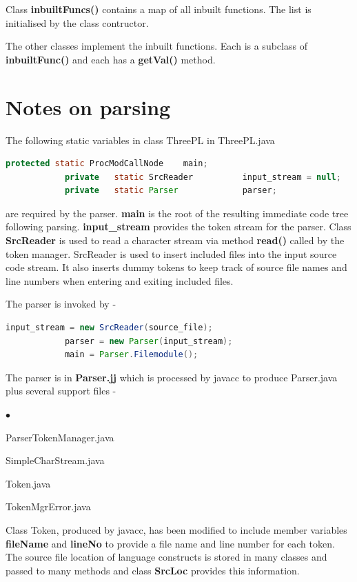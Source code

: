 \documentclass[10pt,a4paper,twoside,fleqn]{book}
\newcommand{\blist}{\begin{list}{$\bullet$}{\setlength{\itemsep}{-5pt}\setlength{\topsep}{-5pt}}}
\newcommand{\blend}{\end{list}}
\begin{document}
            Class {\bf inbuiltFuncs()} contains a map of all inbuilt functions. The
            list is initialised by the class contructor.

            The other classes implement the inbuilt functions. Each is a subclass
            of {\bf inbuiltFunc()} and each has a {\bf getVal()} method.




    \section{Notes on parsing}
    
        The following static variables in class ThreePL in ThreePL.java
        \begin{lstlisting}[gobble=8, language=java]
            protected static ProcModCallNode    main;
            private   static SrcReader          input_stream = null;
            private   static Parser             parser;
        \end{lstlisting}
        are required by the parser. {\bf main} is the root of the resulting
        immediate code tree following parsing. {\bf input\_stream} provides the
        token stream for the parser. Class {\bf SrcReader} is used to read a
        character stream via method {\bf read()} called by the token manager.
        SrcReader is used to insert included files into the input source code
        stream. It also inserts dummy tokens to keep track of source file names and
        line numbers when entering and exiting included files.
    
        The parser is invoked by -
        \begin{lstlisting}[gobble=8, language=java]
            input_stream = new SrcReader(source_file);
            parser = new Parser(input_stream);
            main = Parser.Filemodule();
        \end{lstlisting}
            
        The parser is in {\bf Parser.jj} which is processed by javacc to
        produce Parser.java plus several support files -
    
        \blist
        \item ParserTokenManager.java
        \item SimpleCharStream.java
        \item Token.java
        \item TokenMgrError.java
        \blend
        
        Class Token, produced by javacc, has been modified to include
        member variables {\bf fileName} and {\bf lineNo} to provide a file
        name and line number for each token. The source file location of
        language constructs is stored in many classes and passed to many
        methods and class {\bf SrcLoc} provides this information.
        
\end{document}
